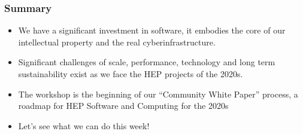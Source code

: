 \begin{frame}
\frametitle{Summary}

\begin{itemize}
\item We have a significant investment in software, it embodies the core of our intellectual property and the real cyberinfrastructure.
\item Significant challenges of scale, performance, technology and long term sustainability exist as we face the HEP projects of the 2020s.
\item The workshop is the beginning of our ``Community White Paper'' process, a roadmap for HEP Software and Computing for the 2020s
\item Let's see what we can do this week!
\end{itemize}

\end{frame}


